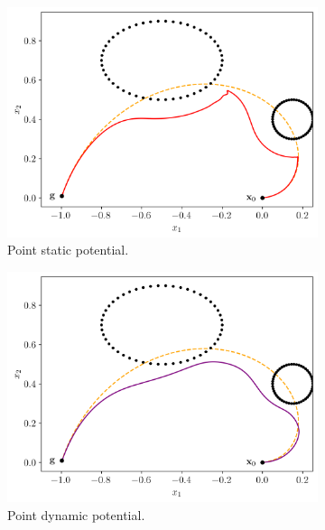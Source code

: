 \documentclass[fleqn, 11pt]{article}
\theoremstyle{definition}
\theoremstyle{plain}
\theoremstyle{remark}
\begin{document}
\begin{figure}[t]
    \begin{subfigure}{0.3\linewidth}
        \includegraphics[width=\textwidth]{imgs/two_obst_point_static.png}
        \caption{Point static potential.}
    \end{subfigure}
    \hfill
    \begin{subfigure}{0.3\linewidth}
        \includegraphics[width=\textwidth]{imgs/two_obst_point_dynamic.png}
        \caption{Point dynamic potential.}
    \end{subfigure}
    \hfill
    \begin{subfigure}{0.3\linewidth}

\end{subfigure}
\end{figure}
\end{document}
